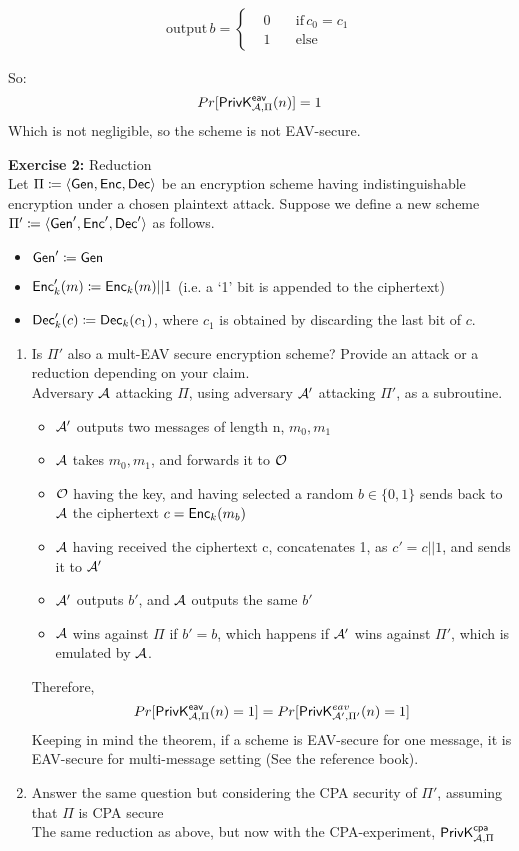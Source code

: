 \documentclass[12pt]{article}
\begin{document}
\begin{align*}
\text{output}\, b= 
\left\{
    \begin {aligned}
         & 0 \quad & \text{if} \,c_0=c_1 \\
         & 1 \quad & \text{else}
     \end{aligned}
\right.
\end{align*}

So:
\begin{equation*}
Pr[\mathsf{PrivK}_{\mathcal{A},\Pi}^\mathsf{eav}(n)] = 1
\end{equation*}
Which is not negligible, so the scheme is not EAV-secure.


\textbf{Exercise 2:} Reduction\\
Let $\Pi \coloneqq \langle \operatorname{\mathsf{Gen}},\operatorname{\mathsf{Enc}},\operatorname{\mathsf{Dec}}\rangle$ be an encryption scheme having
indistinguishable encryption under a chosen plaintext attack. Suppose we
define a new scheme $\Pi' \coloneqq \langle \operatorname{\mathsf{Gen}}',\operatorname{\mathsf{Enc}}',\operatorname{\mathsf{Dec}}'\rangle$ as follows.
\smallskip
\begin{itemize}
  \item $\operatorname{\mathsf{Gen}}' \coloneqq \operatorname{\mathsf{Gen}}$
  \item $\operatorname{\mathsf{Enc}}_k'(m) \coloneqq \operatorname{\mathsf{Enc}}_k(m)||1$ (i.e. a `1' bit is appended to the ciphertext)
  \item $\operatorname{\mathsf{Dec}}_k'(c) \coloneqq \operatorname{\mathsf{Dec}}_k(c_1)$, where $c_1$ is obtained by discarding the last bit of $c$.
\end{itemize}
\begin{enumerate}
\item Is $\Pi'$ also a mult-EAV secure encryption scheme? Provide an attack or a reduction depending on your claim.\\
Adversary $\mathcal{A}$ attacking $\Pi$, using adversary $\mathcal{A}'$ attacking $\Pi'$, as a subroutine.\begin{itemize}
\item $\mathcal{A}'$ outputs two messages of length n, $m_0, m_1$
\item $\mathcal{A}$ takes $m_0, m_1$, and forwards it to $\mathcal{O}$
\item $\mathcal{O}$ having the key, and having selected a random $b \in \{0,1\}$ sends back to $\mathcal{A}$ the ciphertext $c=\operatorname{\mathsf{Enc}}_k(m_b)$
\item $\mathcal{A}$ having received the ciphertext c, concatenates 1, as $c'=c||1$, and sends it to $\mathcal{A}'$
\item $\mathcal{A}'$ outputs $b'$, and $\mathcal{A}$ outputs the same $b'$
\item $\mathcal{A}$ wins against $\Pi$ if $b'=b$, which happens if $\mathcal{A}'$ wins against $\Pi'$, which is emulated by $\mathcal{A}$.
\end{itemize}
Therefore,
\begin{equation*}
Pr[\mathsf{PrivK}_{\mathcal{A},\Pi}^\mathsf{eav}(n)=1] = Pr[\mathsf{PrivK}_{\mathcal{A}',\Pi'}^{eav}(n)=1]
\end{equation*}
Keeping in mind the theorem, if a scheme is EAV-secure for one message, it is EAV-secure for multi-message setting (See the reference book).
\item Answer the same question but considering the CPA security of $\Pi'$, assuming that $\Pi$ is CPA secure\\
The same reduction as above, but now with the CPA-experiment, $\mathsf{PrivK}_{\mathcal{A},\Pi}^\mathsf{cpa}$
\end{enumerate}
\newpage
\end{document}
